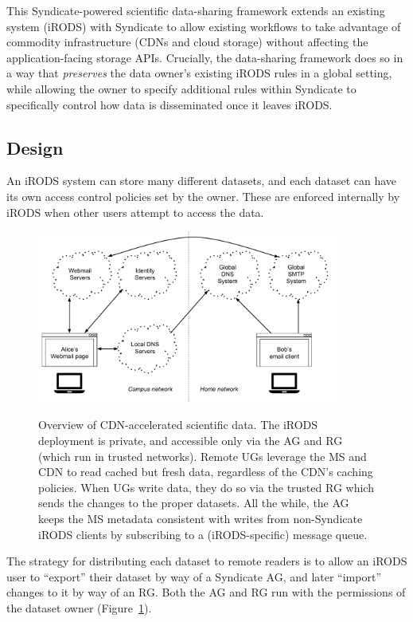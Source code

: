 This Syndicate-powered scientific data-sharing framework extends an existing system (iRODS) with
Syndicate to allow existing workflows to take advantage of commodity infrastructure
(CDNs and cloud storage) without affecting the application-facing storage APIs.
Crucially, the data-sharing framework does so in a way that \emph{preserves} the data owner's existing iRODS
rules in a global setting, while allowing the owner to specify additional
rules within Syndicate to specifically control how data is disseminated once it
leaves iRODS.

\subsection{Design}

An iRODS system can store many different datasets, and each dataset can have its
own access control policies set by the owner.  These are enforced internally by
iRODS when other users attempt to access the data.

\begin{figure}[h]
   \caption{Overview of CDN-accelerated scientific data.  The iRODS deployment
   is private, and accessible only via the AG and RG (which run in trusted
   networks).  Remote UGs leverage the MS and CDN to read cached but fresh data,
   regardless of the CDN's caching policies.  When UGs write data, they do so
   via the trusted RG which sends the changes to the proper datasets.  All the
   while, the AG keeps the MS metadata consistent with writes from non-Syndicate
   iRODS clients by subscribing to a (iRODS-specific) message queue.}
   \centering
   \includegraphics[width=0.9\textwidth,page=25]{figures/dissertation-figures}
   \label{fig:chap4-syndicate-datasets}
\end{figure}

The strategy for distributing each dataset to remote readers is to allow an
iRODS user to ``export'' their dataset by way of a Syndicate AG, and later
``import'' changes to it by way of an RG.  Both the AG and RG run with the
permissions of the dataset owner (Figure~\ref{fig:chap4-syndicate-datasets}).

